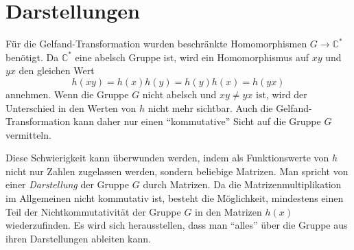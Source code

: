 %
%
%
\section{Darstellungen
\label{buch:gruppen:section:darstellung}}
Für die Gelfand-Transformation wurden beschränkte Homomorphismen
$G\to\mathbb{C}^*$ benötigt.
Da $\mathbb{C}^*$ eine abelsch Gruppe ist, wird ein Homomorphismus
auf $xy$ und $yx$ den gleichen Wert
\[
h(xy) = h(x)h(y) = h(y)h(x) = h(yx)
\]
annehmen.
Wenn die Gruppe $G$ nicht abelsch und $xy\ne yx$ ist, wird der
Unterschied in den Werten von $h$ nicht mehr sichtbar.
Auch die Gelfand-Transformation kann daher nur einen ``kommutative''
Sicht auf die Gruppe $G$ vermitteln.

Diese Schwierigkeit kann überwunden werden, indem als Funktionswerte
von $h$ nicht nur Zahlen zugelassen werden, sondern beliebige
Matrizen.
Man spricht von einer {\em Darstellung} der Gruppe $G$ durch
Matrizen.
Da die Matrizenmultiplikation im Allgemeinen nicht kommutativ
ist, besteht die Möglichkeit, mindestens einen Teil der
Nichtkommutativität der Gruppe $G$ in den Matrizen $h(x)$
wiederzufinden.
Es wird sich herausstellen, dass man ``alles'' über die Gruppe aus
ihren Darstellungen ableiten kann.













